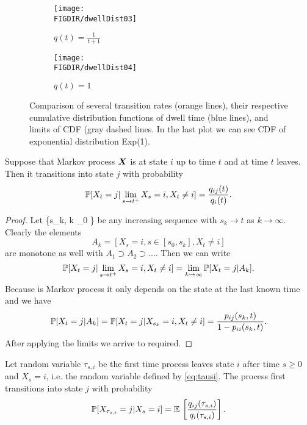 {\begin{figure}
	\begin{subfigure}[b]{0.45\textwidth}
    \centering
		\texttt{[image: \\FIGDIR/dwellDist03]}
    \caption{$q(t) = \frac{1}{t + 1}$}
  \end{subfigure}
	\hfill
	\begin{subfigure}[b]{0.45\textwidth}
    \centering
		\texttt{[image: \\FIGDIR/dwellDist04]}
    \caption{$q(t) = 1$}
  \end{subfigure}

	\caption{Comparison of several transition rates (orange lines), their respective cumulative distribution functions of dwell time (blue lines), and limits of CDF (gray dashed lines. In the last plot we can see CDF of exponential distribution Exp(1).}
	\label{fig:dwellDist}
\end{figure}

\begin{proposition}
	\label{prop:transProb}
	Suppose that Markov process $\bm{X}$ is at state $i$ up to time $t$ and at time $t$ leaves. Then it transitions into state $j$ with probability
	\[
		\operatorname{\mathbb{P}} [X_t = j \vert \lim_{s \to t^+} X_s = i, X_t \neq i ] = \frac{q_{ij}(t)}{q_{i}(t)}.
	\]
\end{proposition}

\begin{proof}
	Let \{s_k, k \in \N_0 \} be any increasing sequence with $s_k \to t$ as $k \to \infty$. Clearly the elements
	\[
		A_k = [ X_s = i, s \in [s_0, s_k], X_t \neq i ]
	\]
	are monotone as well with $A_1 \supset A_2 \supset ...$. Then we can write
	\[
		\operatorname{\mathbb{P}} [X_t = j \vert \lim_{s \to t^+} X_s = i, X_t \neq i ] = \lim_{k \to \infty} \operatorname{\mathbb{P}} [X_t = j \vert A_k].
	\]
	Because \X is Markov process it only depends on the state at the last known time and we have
	\[
		\operatorname{\mathbb{P}} [X_t = j \vert A_k] = \operatorname{\mathbb{P}} [X_t = j \vert X_{s_k}= i, X_t \neq i ] = \frac{p_{ij} (s_k, t)}{1-p_{ii} (s_k, t)}.
	\]
	After applying the limits we arrive to required.
\end{proof}

\begin{proposition}
	Let random variable $\tau_{s,i}$ be the first time process leaves state $i$ after time $s \geq 0$ and $X_s = i$, i.e. the random variable defined by \eqref{eq:tausi}. The process first transitions into state $j$ with probability
	\begin{equation}
		\label{eq:transProb}
		\operatorname{\mathbb{P}} [X_{\tau_{s,i}} = j \vert X_s = i ] = \operatorname{\mathbb{E}\,} \left[ \frac{q_{ij}(\tau_{s,i})}{q_i(\tau_{s,i})} \right].
	\end{equation}
\end{proposition}

}
